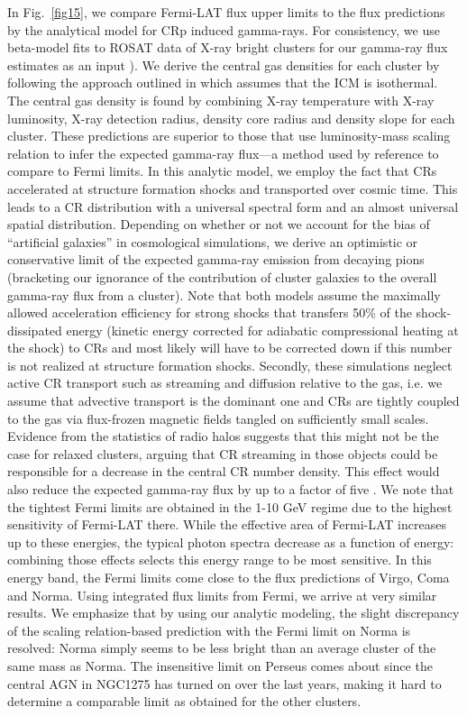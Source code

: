 \documentclass[10pt,aps,pra,reprint,amsmath,amsfonts,amssymb,showpacs,nofootinbib,floatfix]{revtex4-1}
\begin{document}
In Fig.~\ref{fig15}, we compare Fermi-LAT flux upper limits to the
flux predictions by the analytical model \cite{2010MNRAS.409..449P}
for CRp induced gamma-rays. For consistency, we use beta-model fits to
ROSAT data of X-ray bright clusters for our gamma-ray flux estimates
as an input \cite{2002ApJ...567..716R}). We derive the central gas
densities for each cluster by following the approach outlined in
\cite{1999ApJ...517..627M} which assumes that the ICM is
isothermal. The central gas density is found by combining X-ray
temperature with X-ray luminosity, X-ray detection radius, density
core radius and density slope for each cluster. These predictions are
superior to those that use luminosity-mass scaling relation to infer
the expected gamma-ray flux---a method used by reference
\cite{2010ApJ...717L..71A} to compare to Fermi limits.  In this
analytic model, we employ the fact that CRs accelerated at structure
formation shocks and transported over cosmic time. This leads to a CR
distribution with a universal spectral form and an almost universal
spatial distribution. Depending on whether or not we account for the
bias of ``artificial galaxies'' in cosmological simulations, we derive
an optimistic or conservative limit of the expected gamma-ray emission
from decaying pions (bracketing our ignorance of the contribution of
cluster galaxies to the overall gamma-ray flux from a cluster). Note
that both models assume the maximally allowed acceleration efficiency
for strong shocks that transfers 50\% of the shock-dissipated energy
(kinetic energy corrected for adiabatic compressional heating at the
shock) to CRs and most likely will have to be corrected down if this
number is not realized at structure formation shocks. Secondly, these
simulations neglect active CR transport such as streaming and
diffusion relative to the gas, i.e. we assume that advective transport
is the dominant one and CRs are tightly coupled to the gas via
flux-frozen magnetic fields tangled on sufficiently small
scales. Evidence from the statistics of radio halos suggests that this
might not be the case for relaxed clusters, arguing that CR streaming
in those objects could be responsible for a decrease in the central CR
number density. This effect would also reduce the expected gamma-ray
flux by up to a factor of five \cite{2011A&A...527A..99E}. We note
that the tightest Fermi limits are obtained in the 1-10 GeV regime due
to the highest sensitivity of Fermi-LAT there. While the effective
area of Fermi-LAT increases up to these energies, the typical photon
spectra decrease as a function of energy: combining those effects
selects this energy range to be most sensitive.  In this energy band,
the Fermi limits come close to the flux predictions of Virgo, Coma and
Norma. Using integrated flux limits from Fermi, we arrive at very
similar results.  We emphasize that by using our analytic modeling,
the slight discrepancy of the scaling relation-based prediction with
the Fermi limit on Norma \cite{2010ApJ...717L..71A} is resolved: Norma
simply seems to be less bright than an average cluster of the same
mass as Norma. The insensitive limit on Perseus comes about since the
central AGN in NGC1275 has turned on over the last years, making it
hard to determine a comparable limit as obtained for the other
clusters.
\end{document}
